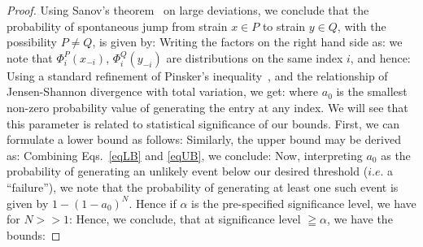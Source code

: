 \documentclass[onecolumn,10pt]{IEEEtran}
\begin{document}
\begin{proof}
  Using Sanov's theorem~\cite{cover} on large deviations, we conclude that the probability of spontaneous jump from strain $x\in P$ to strain $y\in Q$, with the possibility $P \neq Q$, is given by:
  Writing the factors on the right hand side as:
  we note that $\Phi^P_i(x_{-i})$, $\Phi^Q_i(y_{-i})$ are distributions on the same index $i$, and hence:
  Using a standard refinement of Pinsker's inequality~\cite{fedotov2003refinements}, and the relationship of Jensen-Shannon divergence with  total variation, we get:
  where $a_0$ is the smallest non-zero probability value of generating the entry at any index. We will see that this parameter is related to statistical significance of our bounds. First, we can formulate a lower bound as follows:
  Similarly,  the upper bound may be derived as:
  Combining Eqs.~\ref{eqLB} and \ref{eqUB}, we conclude:
  Now, interpreting $a_0$ as the probability of generating an unlikely event below our desired threshold ($i.e.$ a ``failure''), we note that the probability of generating at least one such event is given by $1-(1-a_0)^N$. Hence if $\alpha$ is the pre-specified significance level, we have for $N >> 1 $:
  Hence, we conclude, that at significance level $\geqq \alpha$, we have the bounds:
\end{proof}




 
\end{document}
